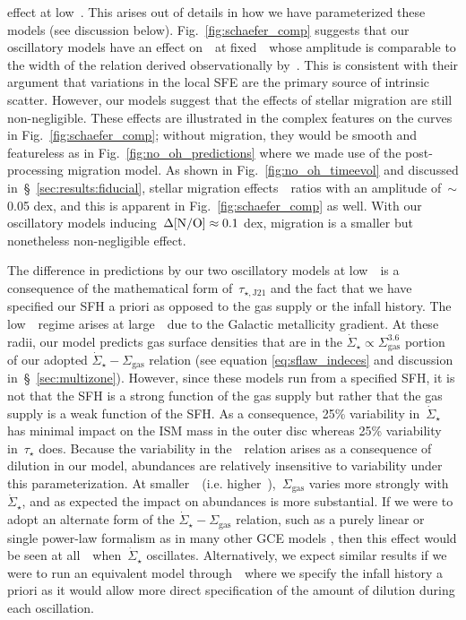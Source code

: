 \documentclass[ms.tex]{subfiles}
\begin{document}
effect at low~\oh.
This arises out of details in how we have parameterized these models (see
discussion below).
Fig.~\ref{fig:schaefer_comp} suggests that our oscillatory models have an
effect on~\no~at fixed~\oh~whose amplitude is comparable to the width of the
relation derived observationally by~\citet{Schaefer2020}.
This is consistent with their argument that variations in the local SFE are
the primary source of intrinsic scatter.
However, our models suggest that the effects of stellar migration are still
non-negligible.
These effects are illustrated in the complex features on the curves in
Fig.~\ref{fig:schaefer_comp}; without migration, they would be smooth and
featureless as in Fig.~\ref{fig:no_oh_predictions} where we made use of the
post-processing migration model.
As shown in Fig.~\ref{fig:no_oh_timeevol} and discussed
in~\S~\ref{sec:results:fiducial}, stellar migration effects~\no~ratios with
an amplitude of~$\sim$0.05 dex, and this is apparent in
Fig.~\ref{fig:schaefer_comp} as well.
With our oscillatory models inducing~$\Delta\text{[N/O]} \approx 0.1$ dex, migration is
a smaller but nonetheless non-negligible effect.
\par
The difference in predictions by our two oscillatory models at low~\oh~is a
consequence of the mathematical form of~$\tau_{\star,\text{J21}}$ and the fact
that we have specified our SFH a priori as opposed to the gas supply or the
infall history.
The low~\oh~regime arises at large~\rgal~due to the Galactic metallicity
gradient.
At these radii, our model predicts gas surface densities that are in the
$\dot{\Sigma}_\star \propto \Sigma_\text{gas}^{3.6}$ portion of our adopted
$\dot{\Sigma}_\star - \Sigma_\text{gas}$ relation (see equation
\ref{eq:sflaw_indeces} and discussion in~\S~\ref{sec:multizone}).
However, since these models run from a specified SFH, it is not that the SFH is
a strong function of the gas supply but rather that the gas supply is a weak
function of the SFH.
As a consequence, 25\% variability in~$\dot{\Sigma}_\star$ has minimal impact
on the ISM mass in the outer disc whereas 25\% variability in~$\tau_\star$
does.
Because the variability in the~\ohno~relation arises as a consequence of
dilution in our model, abundances are relatively insensitive to variability
under this parameterization.
At smaller~\rgal~(i.e. higher~\oh),~$\Sigma_\text{gas}$ varies more strongly
with~$\dot{\Sigma}_\star$, and as expected the impact on abundances is more
substantial.
If we were to adopt an alternate form of the
$\dot{\Sigma}_\star - \Sigma_\text{gas}$ relation, such as a purely linear or
single power-law formalism as in many other GCE models
\citep[e.g.][]{Spitoni2019, Spitoni2021, Grisoni2021}, then this effect would
be seen at all~\oh~when~$\dot{\Sigma}_\star$ oscillates.
Alternatively, we expect similar results if we were to run an equivalent model
through~\vice~where we specify the infall history a priori as it would allow
more direct specification of the amount of dilution during each oscillation.
\end{document}
